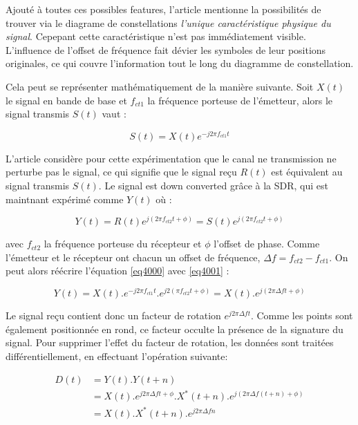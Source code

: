 \vspace{0.1cm}

Ajouté à toutes ces possibles features, l'article mentionne la possibilités de trouver via le diagrame de constellations \textit{l'unique caractéristique physique du signal}. Cepepant cette caractéristique n'est pas immédiatement visible. L'influence de l'offset de fréquence fait dévier les symboles de leur positions originales, ce qui couvre l'information tout le long du diagramme de constellation.

\vspace{0.1cm}

Cela peut se représenter mathématiquement de la manière suivante. Soit $X(t)$ le signal en bande de base et $f_{ct1}$ la fréquence porteuse de l'émetteur, alors le signal transmis $S(t)$ vaut :

\begin{equation}\label{eq4000}
	S(t) = X(t) e^{-j2\pi f_{ct1} t}
\end{equation} 

L'article considère pour cette expérimentation que le canal ne transmission ne perturbe pas le signal, ce qui signifie que le signal reçu $R(t)$ est équivalent au signal transmis $S(t)$. Le signal est down converted grâce à la SDR, qui est maintnant expérimé comme $Y(t)$ où :

\begin{equation}\label{eq4001}
	Y(t) = R(t) e^{j(2\pi f_{ct2} t + \phi)} = S(t) e^{j(2\pi f_{ct2} t + \phi)}
\end{equation} 

avec $f_{ct2}$ la fréquence porteuse du récepteur et $\phi$ l'offset de phase. Comme l'émetteur et le récepteur ont chacun un offset de fréquence, $\Delta f = f_{ct2} - f_{ct1}$. On peut alors réécrire l'équation \ref{eq4000} avec \ref{eq4001} :

\begin{equation}\label{eq4002}
	Y(t) = X(t) . e^{-j2\pi f_{ct1} t} . e^{j2(\pi f_{ct2} t+ \phi)} = X(t) . e^{j(2\pi \Delta f t + \phi)}
\end{equation} 

Le signal reçu contient donc un facteur de rotation $e^{j2\pi \Delta f t}$. Comme les points sont également positionnée en rond, ce facteur occulte la présence de la signature du signal.
Pour supprimer l'effet du facteur de rotation, les données sont traitées différentiellement, en effectuant l'opération suivante:

\begin{align}\label{eq4003}
	D(t) &= Y(t) . Y(t+n) \\
		 &= X(t) . e^{j2\pi \Delta f t+ \phi} .X^{*}(t+n) . e^{j(2\pi \Delta f (t + n) + \phi)} \\
 		 &= X(t) . X^{*}(t+n) . e^{j2\pi \Delta f n}
\end{align}

